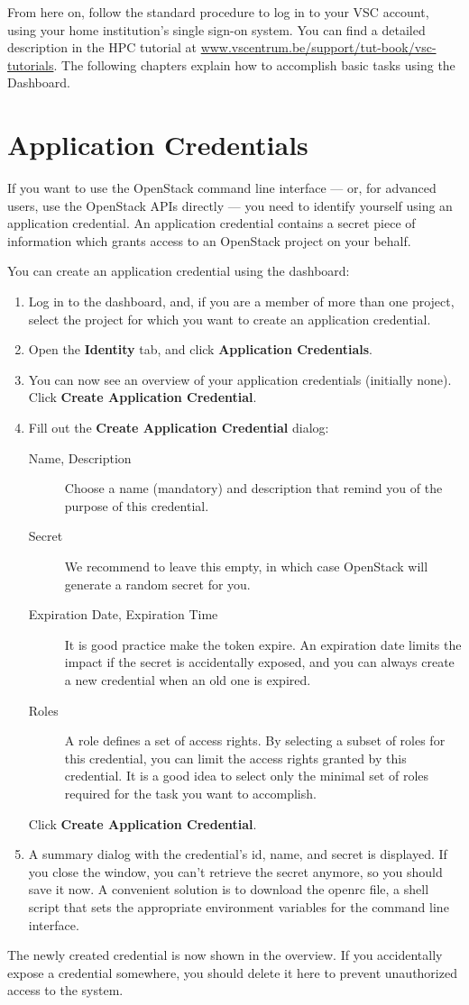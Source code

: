 From here on, follow the standard procedure to log in to your VSC
account, using your home institution's single sign-on system.  You can
find a detailed description in the HPC tutorial at
\href{https://www.vscentrum.be/support/tut-book/vsc-tutorials}{www.vscentrum.be/support/tut-book/vsc-tutorials}.
The following chapters explain how to accomplish basic tasks using the Dashboard.

\section{Application Credentials}\label{sec:appl-cred}
If you want to use the OpenStack command line interface  --- or, for advanced users, use the OpenStack APIs directly --- you need to identify yourself using an application credential.  An application credential contains a secret piece of information which grants access to an OpenStack project on your behalf.

You can create an application credential using the dashboard:
\begin{enumerate}
\item Log in to the dashboard, and, if you are a member of more than
  one project, select the project for which you want to create an
  application credential.
\item Open the \textbf{Identity} tab, and click \textbf{Application
    Credentials}.
\item You can now see an overview of your application credentials
  (initially none).  Click \textbf{Create Application Credential}.
\item Fill out the \textbf{Create Application Credential} dialog:
  \begin{description}
  \item[Name, Description] Choose a name (mandatory) and description
    that remind you of the purpose of this credential.
  \item[Secret] We recommend to leave this empty, in which case
    OpenStack will generate a random secret for you.
  \item[Expiration Date, Expiration Time] It is good practice make the
    token expire.  An expiration date limits the impact if the secret
    is accidentally exposed, and you can always create a new
    credential when an old one is expired.
  \item[Roles] A role defines a set of access rights. By selecting a
    subset of roles for this credential, you can limit the access
    rights granted by this credential.  It is a good idea to select
    only the minimal set of roles required for the task you want to
    accomplish.
  \end{description}
  Click \textbf{Create Application Credential}.
\item A summary dialog with the credential's id, name, and secret is
  displayed.  If you close the window, you can't retrieve the secret
  anymore, so you should save it now.  A convenient solution is to
  download the openrc file, a shell script that sets the appropriate
  environment variables for the command line interface.
\end{enumerate}

The newly created credential is now shown in the overview.  If you
accidentally expose a credential somewhere, you should delete it here
to prevent unauthorized access to the system.

